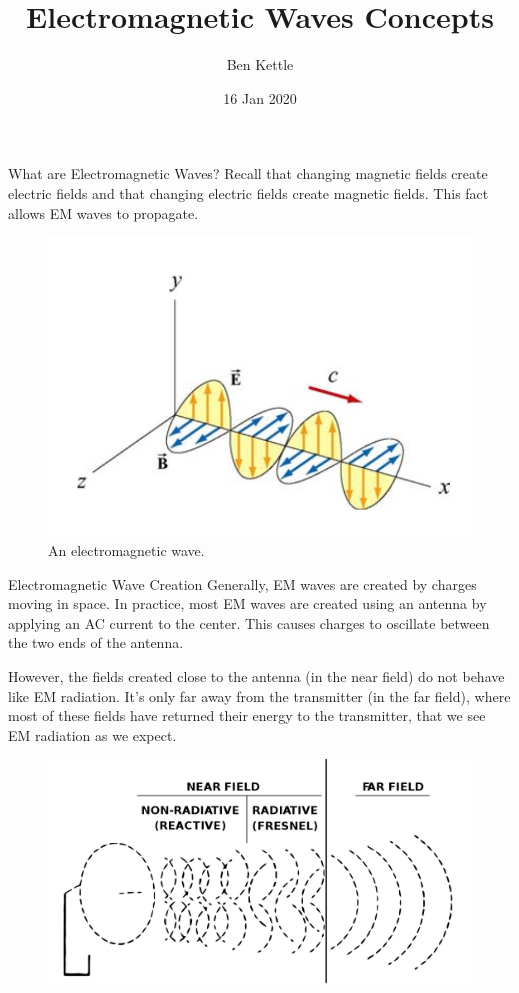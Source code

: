 \documentclass{beamer}
\title{Electromagnetic Waves Concepts}
\author{Ben Kettle}
\date{16 Jan 2020}
\begin{document}
 
\frame{\titlepage}

\begin{frame}{What are Electromagnetic Waves?}
    Recall that changing magnetic fields create electric fields and that changing electric fields create magnetic fields. This fact allows EM waves to propagate. 
    
    \begin{figure}
        \centering
        \includegraphics[scale=.4]{emwave.png}
        \caption{An electromagnetic wave.}
        \label{fig:emwave}
    \end{figure}
\end{frame}

\begin{frame}{Electromagnetic Wave Creation}
    Generally, EM waves are created by charges moving in space. In practice, most EM waves are created using an antenna by applying an AC current to the center. This causes charges to oscillate between the two ends of the antenna. \vspace{2mm}

    However, the fields created close to the antenna (in the \alert{near field}) do not behave like EM radiation. It's only far away from the transmitter (in the \alert{far field}), where most of these fields have returned their energy to the transmitter, that we see EM radiation as we expect. 
    
    \begin{figure}
        \centering
        \includegraphics[scale=.13]{nearfar.png}
        \label{fig:nearfar}
    \end{figure}
    
\end{frame}
\end{document}
